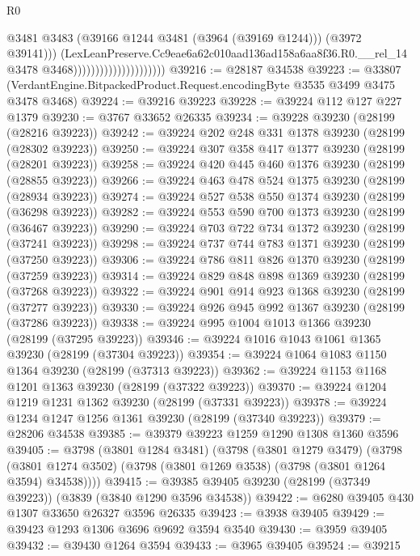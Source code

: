 \begin{lexlean}{R0}
\begin{coremodule}
                                                @3481
                                                @3483
                                                (@39166 @1244 @3481 (@3964 (@39169 @1244)))
                                                (@3972 @39141)))
                                            (LexLeanPreserve.Cc9eae6a62c010aad136ad158a6aa8f36.R0.__rel_14
                                              @3478
                                              @3468)))))))))))))))))))))
@39216 := @28187 @34538
@39223 := @33807 (VerdantEngine.BitpackedProduct.Request.encodingByte @3535 @3499 @3475 @3478 @3468)
@39224 := @39216 @39223
@39228 := @39224 @112 @127 @227 @1379
@39230 := @3767 @33652 @26335
@39234 := @39228 @39230 (@28199 (@28216 @39223))
@39242 := @39224 @202 @248 @331 @1378 @39230 (@28199 (@28302 @39223))
@39250 := @39224 @307 @358 @417 @1377 @39230 (@28199 (@28201 @39223))
@39258 := @39224 @420 @445 @460 @1376 @39230 (@28199 (@28855 @39223))
@39266 := @39224 @463 @478 @524 @1375 @39230 (@28199 (@28934 @39223))
@39274 := @39224 @527 @538 @550 @1374 @39230 (@28199 (@36298 @39223))
@39282 := @39224 @553 @590 @700 @1373 @39230 (@28199 (@36467 @39223))
@39290 := @39224 @703 @722 @734 @1372 @39230 (@28199 (@37241 @39223))
@39298 := @39224 @737 @744 @783 @1371 @39230 (@28199 (@37250 @39223))
@39306 := @39224 @786 @811 @826 @1370 @39230 (@28199 (@37259 @39223))
@39314 := @39224 @829 @848 @898 @1369 @39230 (@28199 (@37268 @39223))
@39322 := @39224 @901 @914 @923 @1368 @39230 (@28199 (@37277 @39223))
@39330 := @39224 @926 @945 @992 @1367 @39230 (@28199 (@37286 @39223))
@39338 := @39224 @995 @1004 @1013 @1366 @39230 (@28199 (@37295 @39223))
@39346 := @39224 @1016 @1043 @1061 @1365 @39230 (@28199 (@37304 @39223))
@39354 := @39224 @1064 @1083 @1150 @1364 @39230 (@28199 (@37313 @39223))
@39362 := @39224 @1153 @1168 @1201 @1363 @39230 (@28199 (@37322 @39223))
@39370 := @39224 @1204 @1219 @1231 @1362 @39230 (@28199 (@37331 @39223))
@39378 := @39224 @1234 @1247 @1256 @1361 @39230 (@28199 (@37340 @39223))
@39379 := @28206 @34538
@39385 := @39379 @39223 @1259 @1290 @1308 @1360 @3596
@39405 := @3798
    (@3801 @1284 @3481)
    (@3798
      (@3801 @1279 @3479)
      (@3798 (@3801 @1274 @3502) (@3798 (@3801 @1269 @3538) (@3798 (@3801 @1264 @3594) @34538))))
@39415 := @39385 @39405 @39230 (@28199 (@37349 @39223)) (@3839 (@3840 @1290 @3596 @34538))
@39422 := @6280 @39405 @430 @1307 @33650 @26327 @3596 @26335
@39423 := @3938 @39405
@39429 := @39423 @1293 @1306 @3696 @9692 @3594 @3540
@39430 := @3959 @39405
@39432 := @39430 @1264 @3594
@39433 := @3965 @39405
@39524 := @39215

\end{coremodule}
\end{lexlean}
